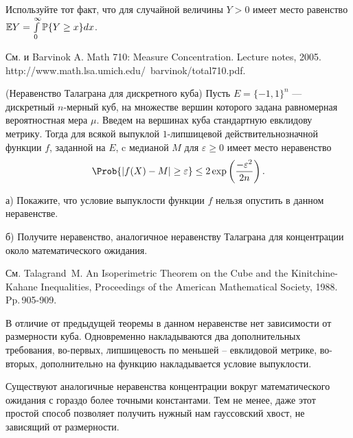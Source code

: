 \begin{remark}
Используйте тот факт, что для случайной величины $Y > 0$ имеет место равенство $\mathrm{{\mathbb E}} Y = \int\limits_{0}^{\infty}\mathrm{{\mathbb P}}\{Y \ge x\}dx$.

См.\cite{22} и Barvinok A. Math 710: Measure Concentration. Lecture notes, 2005. http://www.math.lsa.umich.edu/~barvinok/total710.pdf.
\end{remark}

\begin{problem}(Неравенство Талаграна для дискретного куба) Пусть $E = \{-1, 1\}^{n}$ --- дискретный $n$-мерный куб, на множестве вершин которого задана равномерная вероятностная мера $\mu$. Введем на вершинах куба стандартную евклидову метрику. Тогда для всякой выпуклой $1$-липшицевой действительнозначной функции $f$, заданной на $E$, c медианой $M$ для $\varepsilon \ge 0$ имеет место неравенство
\[
\Prob\{\left|f(X) - M\right| \ge \varepsilon\} \le 2\exp\left(\frac{-\varepsilon^{2}}{2n}\right).
\]

а) Покажите, что условие выпуклости функции $f$ нельзя опустить в данном неравенстве.


б) Получите неравенство, аналогичное неравенству Талаграна для концентрации около математического ожидания.
\end{problem}
\begin{remark}
См. Talagrand~M. An Isoperimetric Theorem on the Cube and the Kinitchine-Kahane Inequalities,
Proceedings of the American Mathematical Society, 1988. Pp.\,905-909.

В отличие от предыдущей теоремы в данном неравенстве нет зависимости от размерности куба. Одновременно накладываются два дополнительных требования, во-первых, липшицевость по меньшей -- евклидовой метрике, во-вторых, дополнительно на функцию накладывается условие выпуклости.

Существуют аналогичные неравенства концентрации вокруг математического ожидания с гораздо более точными константами. Тем не менее, даже этот простой способ позволяет получить нужный нам гауссовский хвост, не зависящий от размерности.
\end{remark}

